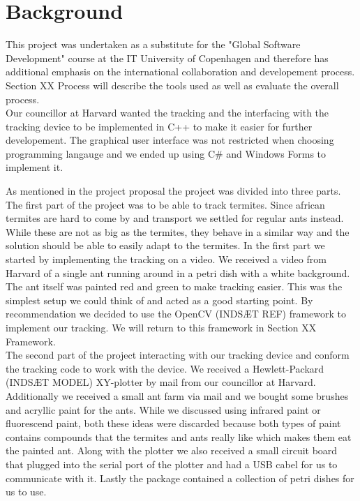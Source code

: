 
\section{Background}


This project was undertaken as a substitute for the "Global Software Development" course at the IT University of Copenhagen and therefore has additional emphasis on the international collaboration and developement process. Section XX Process will describe the tools used as well as evaluate the overall process. \\ 

Our councillor at Harvard wanted the tracking and the interfacing with the tracking device to be implemented in C++ to make it easier for further developement. The graphical user interface was not restricted when choosing programming langauge and we ended up using C\# and Windows Forms to implement it.

As mentioned in the project proposal the project was divided into three parts. The first part of the project was to be able to track termites. Since african termites are hard to come by and transport we settled for regular ants instead. While these are not as big as the termites, they behave in a similar way and the solution should be able to easily adapt to the termites. In the first part we started by implementing the tracking on a video. We received a video from Harvard of a single ant running around in a petri dish with a white background. The ant itself was painted red and green to make tracking easier. This was the simplest setup we could think of and acted as a good starting point. By recommendation we decided to use the OpenCV (INDSÆT REF) framework to implement our tracking. We will return to this framework in Section XX Framework. \\

The second part of the project interacting with our tracking device and conform the tracking code to work with the device. We received a Hewlett-Packard (INDSÆT MODEL) XY-plotter by mail from our councillor at Harvard. Additionally we received a small ant farm via mail and we bought some brushes and acryllic paint for the ants. While we discussed using infrared paint or fluorescend paint, both these ideas were discarded because both types of paint contains compounds that the termites and ants really like which makes them eat the painted ant. Along with the plotter we also received a small circuit board that plugged into the serial port of the plotter and had a USB cabel for us to communicate with it. Lastly the package contained a collection of petri dishes for us to use. \\

